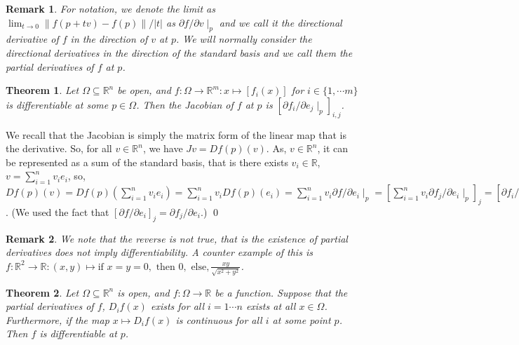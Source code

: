\documentclass[
]{article}
\newtheorem{theorem}{Theorem}
\newtheorem*{remark}{Remark}
\theoremstyle{definition}
\begin{document}
\begin{remark}
  For notation, we denote the limit as 
  \(\lim_{t \to 0} \|f(p + tv) - f(p)\| / \left|t\right|\) as 
  \(\partial f / \partial v \mid_p\) and we call it the directional derivative 
  of \(f\) in the direction of \(v\) at \(p\). We will normally consider the 
  directional derivatives in the direction of the standard basis and we call 
  them the partial derivatives of \(f\) at \(p\).
\end{remark}

\begin{theorem}
  Let \(\Omega \subseteq \mathbb{R}^n\) be open, and 
  \(f : \Omega \to \mathbb{R}^m : x \mapsto [f_i(x)]\) for 
  \(i \in \{1, \cdots m\}\) is differentiable at some \(p \in \Omega\). Then 
  the Jacobian of \(f\) at \(p\) is \([\partial f_i / \partial e_j \mid_p]_{i, j}\).
\end{theorem} 
\proof

We recall that the Jacobian is simply the matrix form of the linear map
that is the derivative. So, for all \(v \in \mathbb{R}^n\), we have
\(J v = Df(p)(v)\). As, \(v \in \mathbb{R}^n\), it can be represented as
a sum of the standard basis, that is there exists
\(v_i \in \mathbb{R}\), \(v = \sum_{i = 1}^n v_i e_i\), so,
\(Df(p)(v) = Df(p)(\sum_{i = 1}^n v_i e_i)  = \sum_{i = 1}^n v_i Df(p)(e_i)  = \sum_{i = 1}^n v_i \partial f / \partial e_i \mid_p  = [\sum_{i = 1}^n v_i \partial f_j / \partial e_i \mid_p]_j  = [\partial f_i / \partial e_j \mid_p]_{i, j} v\).
(We used the fact that
\([\partial f / \partial e_i]_j  = \partial f_j / \partial e_i\).) \qed

\begin{remark}
  We note that the reverse is not true, that is the existence of partial 
  derivatives does not imply differentiability. A counter example of this is 
  \(f : \mathbb{R}^2 \to \mathbb{R} : (x, y) \mapsto \text{if } x = y = 0, \text{ then } 0,
  \text{ else}, \frac{xy}{\sqrt{x^2 + y^2}}\).
\end{remark}

\begin{theorem}\label{strong}
  Let \(\Omega \subseteq \mathbb{R}^n\) is open, and \(f : \Omega \to \mathbb{R}\) 
  be a function. Suppose that the partial derivatives of \(f\), \(D_i f(x)\) exists 
  for all \(i = 1 \cdots n\) exists at all \(x \in \Omega\).  Furthermore, 
  if the map \(x \mapsto D_i f(x)\) is continuous for all \(i\) at some point 
  \(p\). Then \(f\) is differentiable at \(p\).
\end{theorem}
\end{document}
